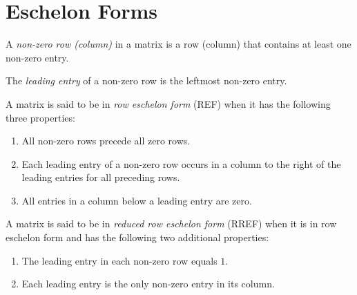 \documentclass[letterpaper,12pt,fleqn]{article}
\begin{document}
\section*{Eschelon Forms}

\begin{definition}
  A \emph{non-zero row (column)} in a matrix is a row (column) that contains at least one
  non-zero entry.

  The \emph{leading entry} of a non-zero row is the leftmost non-zero entry.
\end{definition}

\begin{definition}
  A matrix is said to be in \emph{row eschelon form} (REF) when it has the following
  three properties:
  \begin{enumerate}
  \item All non-zero rows precede all zero rows.
  \item Each leading entry of a non-zero row occurs in a column to the right of the
    leading entries for all preceding rows.
  \item All entries in a column below a leading entry are zero.
  \end{enumerate}

  A matrix is said to be in \emph{reduced row eschelon form} (RREF) when it is in row
  eschelon form and has the following two additional properties:
  \begin{enumerate}
  \item The leading entry in each non-zero row equals $1$.
  \item Each leading entry is the only non-zero entry in its column.
  \end{enumerate}
\end{definition}
\end{document}
